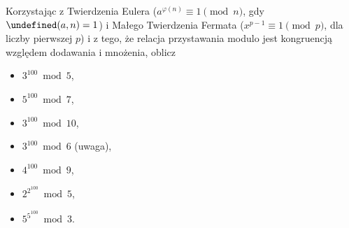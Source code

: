 \documentclass[12pt]{article}
\let\gcd\undefined
\DeclareMathOperator{\gcd}{gcd}
\begin{document}
\begin{enumerate}
 Korzystając z Twierdzenia Eulera ($a^{\varphi(n)} \equiv 1 \pmod n$, gdy $\gcd(a,n)=1$) i Małego Twierdzenia Fermata 
($x^{p-1}\equiv 1 \pmod p$, dla liczby pierwszej $p$)
i z tego, że relacja przystawania modulo jest kongruencją
względem dodawania i mnożenia,
oblicz
\begin{itemize}
    \item $3^{100} \bmod 5$,
    \item $5^{100} \bmod 7$,
    \item $3^{100}\bmod 10$,
    \item $3^{100}\bmod 6$ (uwaga),
    \item $4^{100}\bmod 9$,
    \item $2^{2^{100}} \bmod 5$,
    \item $5^{5^{100}} \bmod 3$.
\end{itemize}

\end{enumerate}
\end{document}

